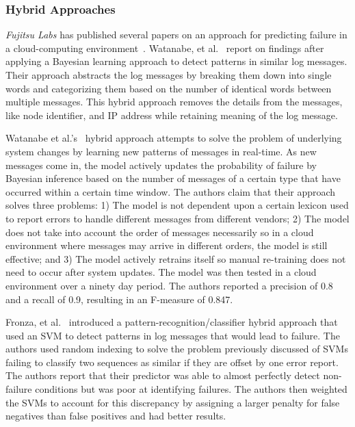 \subsubsection{Hybrid Approaches}
\emph{Fujitsu Labs} has published several papers on an approach for predicting
failure in a cloud-computing
environment~\cite{sonoda2012,watanabe2012,watanabe2014}.  Watanabe, et
al.~\cite{watanabe2014, watanabe2012} report on findings after applying a
Bayesian learning approach to detect patterns in similar log messages.  Their
approach abstracts the log messages by breaking them down into single words and
categorizing them based on the number of identical words between multiple
messages.  This hybrid approach removes the details from the messages, like
node identifier, and IP address while retaining meaning of the log message.

Watanabe et al.'s~\cite{watanabe2014} hybrid approach attempts to solve the
problem of underlying system changes by learning new patterns of messages in
real-time.  As new messages come in, the model actively updates the probability
of failure by Bayesian inference based on the number of messages of a certain
type that have occurred within a certain time window.  The authors claim that
their approach solves three problems: 1)  The model is not dependent upon a
certain lexicon used to report errors to handle different messages from
different vendors; 2) The model does not take into account the order of
messages necessarily so in a cloud environment where messages may arrive in
different orders, the model is still effective; and 3)  The model actively
retrains itself so manual re-training does not need to occur after system
updates.  The model was then tested in a cloud environment over a ninety day
period.  The authors reported a precision of 0.8 and a recall of 0.9, resulting
in an F-measure of 0.847.  

Fronza, et al.~\cite{fronza2013} introduced a pattern-recognition/classifier
hybrid approach that used an SVM to detect patterns in log messages that would
lead to failure.  The authors used random indexing to solve the problem
previously discussed of SVMs failing to classify two sequences as similar if
they are offset by one error report.  The authors report that their predictor
was able to almost perfectly detect non-failure conditions but was poor at
identifying failures.  The authors then weighted the SVMs to account for this
discrepancy by assigning a larger penalty for false negatives than false
positives and had better results.

